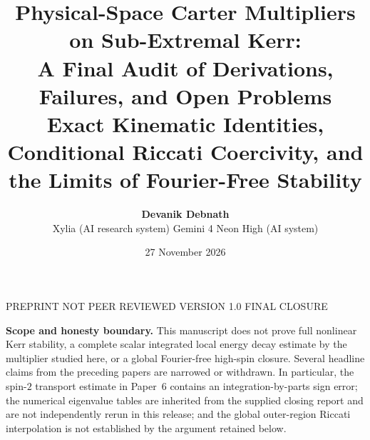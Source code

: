 \documentclass[11pt,a4paper]{article}
\title{\vspace{-1.0cm}\textbf{\color{navy}Physical-Space Carter Multipliers on Sub-Extremal Kerr:\\[3pt]
A Final Audit of Derivations, Failures, and Open Problems}\\[8pt]
\large\color{slate}Exact Kinematic Identities, Conditional Riccati Coercivity, and the Limits of Fourier-Free Stability}
\author{\textbf{Devanik Debnath}\\[3pt]
\small Xylia (AI research system) \quad\textbullet\quad Gemini 4 Neon High (AI system)}
\date{27 November 2026}
\theoremstyle{remark}
\theoremstyle{definition}
\begin{document}
\maketitle
\begin{center}
\small\textcolor{slate}{PREPRINT \;\textbullet\; NOT PEER REVIEWED \;\textbullet\; VERSION 1.0 \;\textbullet\; FINAL CLOSURE}
\end{center}
\begin{tcolorbox}[breakable,colback=paleRed,colframe=ff,boxrule=0.7pt,left=8pt,right=8pt,top=7pt,bottom=7pt]
\textbf{Scope and honesty boundary.} This manuscript does not prove full nonlinear Kerr stability, a complete scalar integrated local energy decay estimate by the multiplier studied here, or a global Fourier-free high-spin closure. Several headline claims from the preceding papers are narrowed or withdrawn. In particular, the spin-$2$ transport estimate in Paper~6 contains an integration-by-parts sign error; the numerical eigenvalue tables are inherited from the supplied closing report and are not independently rerun in this release; and the global outer-region Riccati interpolation is not established by the argument retained below.
\end{tcolorbox}
\end{document}
